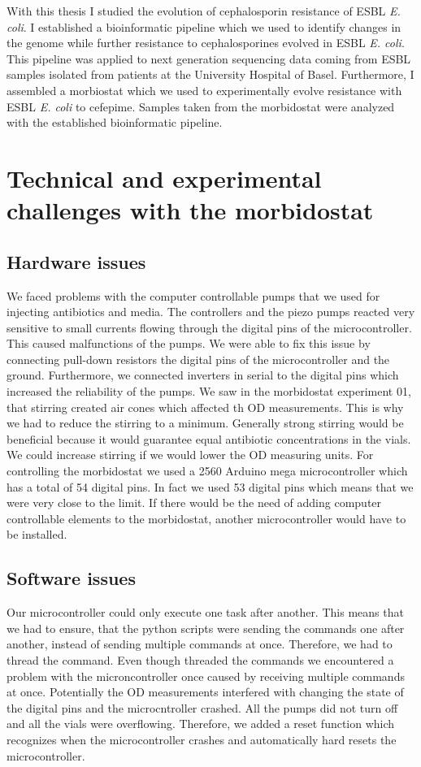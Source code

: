 With this thesis I studied the evolution of cephalosporin resistance of ESBL \textit{E. coli}. I established a bioinformatic pipeline which we used to identify changes in the genome while further resistance to cephalosporines evolved in ESBL \textit{E. coli}. This pipeline was applied to next generation sequencing data coming from ESBL samples isolated from patients at the University Hospital of Basel. Furthermore, I assembled a morbiostat which we used to experimentally evolve resistance with ESBL \textit{E. coli} to cefepime. Samples taken from the morbidostat were analyzed with the established bioinformatic pipeline. 

\section{Technical and experimental challenges with the morbidostat}
\subsection{Hardware issues}
We faced problems with the computer controllable pumps that we used for injecting antibiotics and media. The controllers and the piezo pumps reacted very sensitive to small currents flowing through the digital pins of the microcontroller. This caused malfunctions of the pumps. We were able to fix this issue by connecting pull-down resistors the digital pins of the microcontroller and the ground. Furthermore, we connected inverters in serial to the digital pins which increased the reliability of the pumps. We saw in the morbidostat experiment 01, that stirring created air cones which affected th OD measurements. This is why we had to reduce the stirring to a minimum. Generally strong stirring would be beneficial because it would guarantee equal antibiotic concentrations in the vials. We could increase stirring if we would lower the OD measuring units. For controlling the morbidostat we used a 2560 Arduino mega microcontroller which has a total of 54 digital pins. In fact we used 53 digital pins which means that we were very close to the limit. If there would be the need of adding computer controllable elements to the morbidostat, another microcontroller would have to be installed. 

\subsection{Software issues}
Our microcontroller could only execute one task after another. This means that we had to ensure, that the python scripts were sending the commands one after another, instead of sending multiple commands at once. Therefore, we had to thread the command.  Even though threaded the commands we encountered a problem with the microncontroller once caused by receiving multiple commands at once. Potentially the OD measurements interfered with changing the state of the digital pins and the microcntroller crashed. All the pumps did not turn off and all the vials were overflowing. Therefore, we added a reset function which recognizes when the microcontroller crashes and automatically hard resets the microcontroller. 

